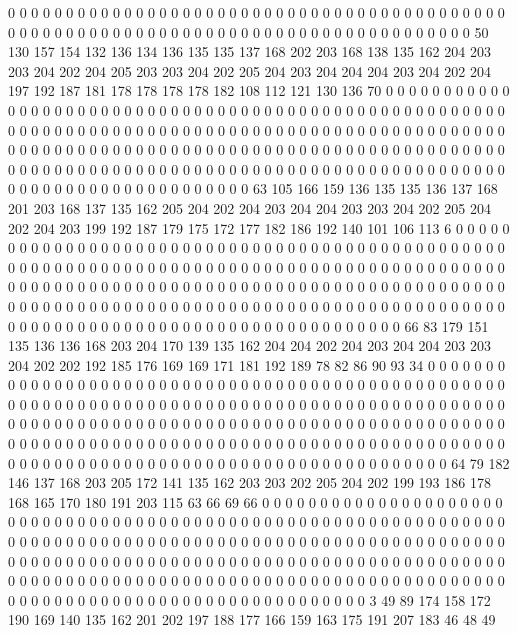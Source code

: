 0 0 0 0 0 0 0 0 0 0 0 0 0 0 0 0 0 0 0 0
0 0 0 0 0 0 0 0 0 0 0 0 0 0 0 0 0 0 0 0
0 0 0 0 0 0 0 0 0 0 0 0 0 0 0 0 0 0 0 0
0 0 0 0 0 0 0 0 0 0 0 0 0 0 0 0 0 0 0 0
0 0 0 50 130 157 154 132 136 134 136 135 135 137 168 202 203 168 138 135
162 204 203 203 204 202 204 205 203 203 204 202 205 204 203 204 204 204 203 204
202 204 197 192 187 181 178 178 178 178 182 108 112 121 130 136 70 0 0 0
0 0 0 0 0 0 0 0 0 0 0 0 0 0 0 0 0 0 0 0
0 0 0 0 0 0 0 0 0 0 0 0 0 0 0 0 0 0 0 0
0 0 0 0 0 0 0 0 0 0 0 0 0 0 0 0 0 0 0 0
0 0 0 0 0 0 0 0 0 0 0 0 0 0 0 0 0 0 0 0
0 0 0 0 0 0 0 0 0 0 0 0 0 0 0 0 0 0 0 0
0 0 0 0 0 0 0 0 0 0 0 0 0 0 0 0 0 0 0 0
0 0 0 0 0 0 0 0 0 0 0 0 0 0 0 0 0 0 0 0
0 0 0 0 0 0 0 0 0 0 0 0 0 0 0 0 0 0 0 0
0 0 0 0 0 0 0 0 0 0 0 0 0 0 0 0 0 0 0 0
0 0 0 0 0 0 0 0 0 0 0 0 0 0 0 0 0 0 0 0
0 63 105 166 159 136 135 135 136 137 168 201 203 168 137 135 162 205 204 202
204 203 204 204 203 203 204 202 205 204 202 204 203 199 192 187 179 175 172 177
182 186 192 140 101 106 113 6 0 0 0 0 0 0 0 0 0 0 0 0
0 0 0 0 0 0 0 0 0 0 0 0 0 0 0 0 0 0 0 0
0 0 0 0 0 0 0 0 0 0 0 0 0 0 0 0 0 0 0 0
0 0 0 0 0 0 0 0 0 0 0 0 0 0 0 0 0 0 0 0
0 0 0 0 0 0 0 0 0 0 0 0 0 0 0 0 0 0 0 0
0 0 0 0 0 0 0 0 0 0 0 0 0 0 0 0 0 0 0 0
0 0 0 0 0 0 0 0 0 0 0 0 0 0 0 0 0 0 0 0
0 0 0 0 0 0 0 0 0 0 0 0 0 0 0 0 0 0 0 0
0 0 0 0 0 0 0 0 0 0 0 0 0 0 0 0 0 0 0 0
0 0 0 0 0 0 0 0 0 0 0 0 0 0 0 0 0 0 0 0
0 0 0 0 0 0 0 0 0 0 0 0 0 0 0 0 0 0 0 66
83 179 151 135 136 136 168 203 204 170 139 135 162 204 204 202 204 203 204 204
203 203 204 202 202 192 185 176 169 169 171 181 192 189 78 82 86 90 93 34
0 0 0 0 0 0 0 0 0 0 0 0 0 0 0 0 0 0 0 0
0 0 0 0 0 0 0 0 0 0 0 0 0 0 0 0 0 0 0 0
0 0 0 0 0 0 0 0 0 0 0 0 0 0 0 0 0 0 0 0
0 0 0 0 0 0 0 0 0 0 0 0 0 0 0 0 0 0 0 0
0 0 0 0 0 0 0 0 0 0 0 0 0 0 0 0 0 0 0 0
0 0 0 0 0 0 0 0 0 0 0 0 0 0 0 0 0 0 0 0
0 0 0 0 0 0 0 0 0 0 0 0 0 0 0 0 0 0 0 0
0 0 0 0 0 0 0 0 0 0 0 0 0 0 0 0 0 0 0 0
0 0 0 0 0 0 0 0 0 0 0 0 0 0 0 0 0 0 0 0
0 0 0 0 0 0 0 0 0 0 0 0 0 0 0 0 0 0 0 0
0 0 0 0 0 0 0 0 0 0 0 0 0 0 0 0 0 64 79 182
146 137 168 203 205 172 141 135 162 203 203 202 205 204 202 199 193 186 178 168
165 170 180 191 203 115 63 66 69 66 0 0 0 0 0 0 0 0 0 0
0 0 0 0 0 0 0 0 0 0 0 0 0 0 0 0 0 0 0 0
0 0 0 0 0 0 0 0 0 0 0 0 0 0 0 0 0 0 0 0
0 0 0 0 0 0 0 0 0 0 0 0 0 0 0 0 0 0 0 0
0 0 0 0 0 0 0 0 0 0 0 0 0 0 0 0 0 0 0 0
0 0 0 0 0 0 0 0 0 0 0 0 0 0 0 0 0 0 0 0
0 0 0 0 0 0 0 0 0 0 0 0 0 0 0 0 0 0 0 0
0 0 0 0 0 0 0 0 0 0 0 0 0 0 0 0 0 0 0 0
0 0 0 0 0 0 0 0 0 0 0 0 0 0 0 0 0 0 0 0
0 0 0 0 0 0 0 0 0 0 0 0 0 0 0 0 0 0 0 0
0 0 0 0 0 0 0 0 0 0 0 0 0 0 0 0 0 0 0 0
0 0 0 0 0 0 0 0 0 0 0 0 0 0 3 49 89 174 158 172
190 169 140 135 162 201 202 197 188 177 166 159 163 175 191 207 183 46 48 49
